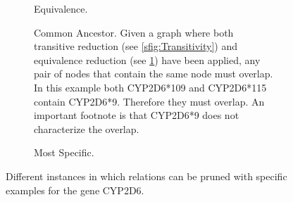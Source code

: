 \begin{figure}
    \begin{subfigure}{\subfigurelength}
        \centering
        \caption{Equivalence.
        }
        \label{sfig:Equivalence-Reduction}
    \end{subfigure}
    \begin{subfigure}{\subfigurelength}
        \centering
        
        \caption{Common Ancestor. 
            Given a graph where both transitive reduction (see \ref{sfig:Transitivity}) and equivalence reduction (see \ref{sfig:Equivalence-Reduction}) have been applied, any pair of nodes that contain the same node must overlap. 
            In this example both CYP2D6*109 and CYP2D6*115 contain CYP2D6*9. 
            Therefore they must overlap. 
            An important footnote is that CYP2D6*9 does not characterize the overlap. %
        }
        \label{sfig:Common-Ancestor}
    \end{subfigure}
    \begin{subfigure}{\subfigurelength}
        \centering
        
        \caption{Most Specific.
        }
        \label{sfig:Most-Specific}
    \end{subfigure}
    \caption{Different instances in which relations can be pruned with specific examples for the gene CYP2D6.}
    \label{fig:Pruning}
\end{figure}
